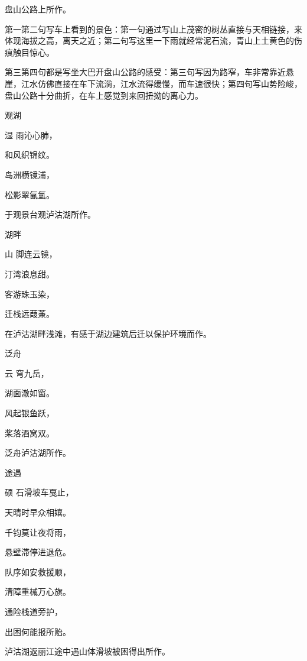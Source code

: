 \documentclass{article}
\newenvironment{poem}[3]{
\begin{minipage}{\textwidth}
\begin{pinyinscope}\begin{center}\Large\linespread{1.4}\selectfont #2\end{center}\end{pinyinscope}
\begin{pinyinscope}
	\begin{center}
	\Large\linespread{1.4}\rmfamily\selectfont #3
}{\end{center}
\end{pinyinscope}
\end{minipage}
}
\begin{document}
盘山公路上所作。

第一第二句写车上看到的景色：第一句通过写山上茂密的树丛直接与天相链接，来体现海拔之高，离天之近；第二句写这里一下雨就经常泥石流，青山上土黄色的伤痕触目惊心。

第三第四句都是写坐大巴开盘山公路的感受：第三句写因为路窄，车非常靠近悬崖，江水仿佛直接在车下流淌，江水流得缓慢，而车速很快；第四句写山势险峻，盘山公路十分曲折，在车上感觉到来回扭拗的离心力。

\bigbreak

\begin{poem}{}{观湖}
湿雨沁心肺，

和风织锦纹。

岛洲横镜浦，

松影翠氤氲。
\end{poem}

于观景台观泸沽湖所作。

\bigbreak

\begin{poem}{}{湖畔}
山脚连云镜，

汀湾浪息甜。

客游珠玉染，

迁栈远葭蒹。
\end{poem}

在泸沽湖畔浅滩，有感于湖边建筑后迁以保护环境而作。

\bigbreak

\begin{poem}{}{泛舟}
云穹{}九岳，

湖面澈如窗。

风起银鱼跃，

桨落酒窝双。
\end{poem}

泛舟泸沽湖所作。

\bigbreak


\begin{poem}{}{途遇}
硕石滑坡车戛止，

天晴时早众相嬉。

千钧莫让夜将雨，

悬壁滞停进退危。

队序如安救援顺，

清障重械万心旗。

{}通险栈道旁护，

出困何能报所贻。
\end{poem}

泸沽湖返丽江途中遇山体滑坡被困得出所作。
\end{document}
